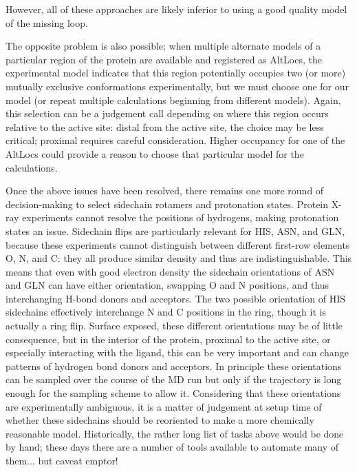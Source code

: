 \documentclass[9pt,bestpractices]{livecoms}
\begin{document}
However, all of these approaches are likely inferior to using a good quality model of the missing loop. 

The opposite problem is also possible; when multiple alternate models of a particular region of the protein are available and registered as AltLocs, the experimental model indicates that this region potentially occupies two (or more) mutually exclusive conformations experimentally, but we must choose one for our model (or repeat multiple calculations beginning from different models). Again, this selection can be a judgement call depending on where this region occurs relative to the active site: distal from the active site, the choice may be less critical; proximal requires careful consideration. Higher occupancy for one of the AltLocs could provide a reason to choose that particular model for the calculations.

Once the above issues have been resolved, there remains one more round of decision-making to select sidechain rotamers and protonation states. Protein X-ray experiments cannot resolve the positions of hydrogens, making protonation states an issue. Sidechain flips are particularly relevant for HIS, ASN, and GLN, because these experiments cannot distinguish between different first-row elements O, N, and C: they all produce similar density and thus are indistinguishable. This means that even with good electron density the sidechain orientations of ASN and GLN can have either orientation, swapping O and N positions, and thus interchanging H-bond donors and acceptors. The two possible orientation of HIS sidechains effectively interchange N and C positions in the ring, though it is actually a ring flip. Surface exposed, these different orientations may be of little consequence, but in the interior of the protein, proximal to the active site, or especially interacting with the ligand, this can be very important and can change patterns of hydrogen bond donors and acceptors. In principle these orientations can be sampled over the course of the MD run but only if the trajectory is long enough for the sampling scheme to allow it. Considering that these orientations are experimentally ambiguous, it is a matter of judgement at setup time of whether these sidechains should be reoriented to make a more chemically reasonable model. Historically, the rather long list of tasks above would be done by hand; these days there are a number of tools available to automate many of them... but caveat emptor!
\end{document}
